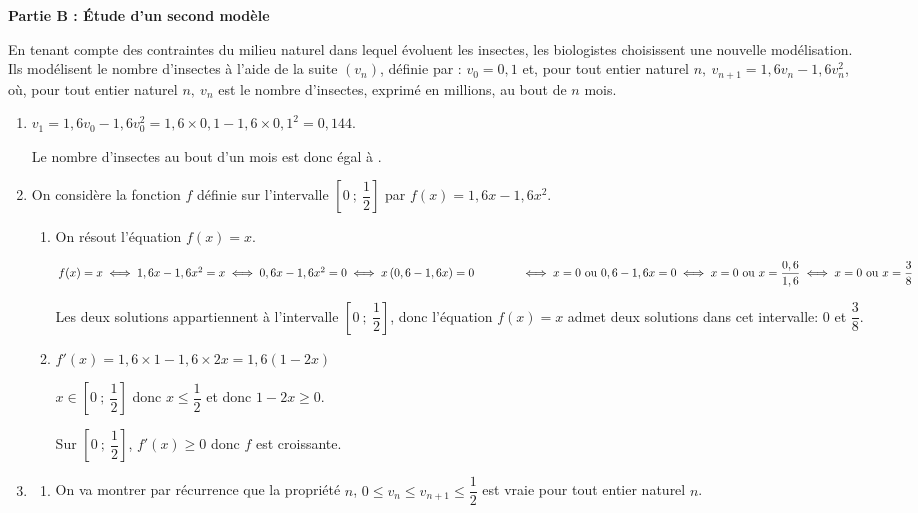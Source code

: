 \bigskip

\textbf{Partie B : Étude d'un second modèle}

\medskip

En tenant compte des contraintes du milieu naturel dans lequel évoluent les insectes, les biologistes choisissent une nouvelle modélisation.
Ils modélisent le nombre d'insectes à l'aide de la suite $\left(v_n\right)$, définie par :
$v_0 = 0,1$  et, pour tout entier naturel $n,\: v_{n+1} = 1,6v_n - 1,6v_n^2$,
où, pour tout entier naturel $n,\: v_n$ est le nombre d'insectes, exprimé en millions, au bout de $n$ mois.

\medskip

\begin{enumerate}
\item $v_1=1,6v_0 - 1,6 v_0^2 = 1,6\times 0,1 - 1,6\times 0,1^2 = 0,144$.

Le nombre d'insectes au bout d'un mois est donc égal à .

\item On considère la fonction $f$ définie sur l'intervalle $\left[0~;~\dfrac12\right]$ par
$f(x) = 1,6x - 1,6x^2$.

	\begin{enumerate}
		\item On résout l'équation $f(x) = x$.

$f(x)=x
\iff
1,6x-1,6x^2=x
\iff
0,6x - 1,6x^2=0
\iff
x\left (0,6-1,6x\right )=0\\
\phantom{f(x)=x}
\iff
x=0 \text{ ou }	0,6-1,6x=0
\iff
x=0 \text{ ou } x=\dfrac{0,6}{1,6}
\iff
x=0 \text{ ou } x=\dfrac{3}{8}$

Les deux solutions appartiennent à l'intervalle $\left[0~;~\dfrac12\right]$, donc l'équation $f(x)=x$ admet deux solutions dans cet intervalle: 0 et $\dfrac{3}{8}$.
		
		\item %
$f'(x)=1,6\times 1 - 1,6\times 2x = 1,6\left (1-2x\right )$

$x\in\left[0~;~\dfrac12\right]$ donc $x\leqslant \dfrac{1}{2}$ et donc $1-2x\geqslant 0$.

Sur $\left[0~;~\dfrac12\right]$, $f'(x)\geqslant 0$ donc $f$ est croissante.
			\end{enumerate}
\item 
	\begin{enumerate}
		\item On va montrer par récurrence que la propriété $n$, $0 \leqslant v_n  \leqslant  v_{n+1} \leqslant  \dfrac12$ est vraie pour tout entier naturel $n$.
		

\end{enumerate}
\end{enumerate}
